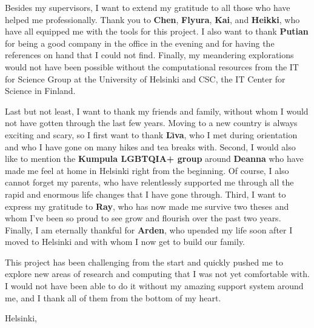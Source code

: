 \begin{acknowledgements}
    Besides my supervisors, I want to extend my gratitude to all those who have helped me professionally. Thank you to \textbf{Chen}, \textbf{Flyura}, \textbf{Kai}, and \textbf{Heikki}, who have all equipped me with the tools for this project. I also want to thank \textbf{Putian} for being a good company in the office in the evening and for having the references on hand that I could not find. Finally, my meandering explorations would not have been possible without the computational resources from the IT for Science Group at the University of Helsinki and CSC, the IT Center for Science in Finland.

    Last but not least, I want to thank my friends and family, without whom I would not have gotten through the last few years. Moving to a new country is always exciting and scary, so I first want to thank \textbf{L\={\i}va}, who I met during orientation and who I have gone on many hikes and tea breaks with. Second, I would also like to mention the \textbf{Kumpula LGBTQIA+ group} around \textbf{Deanna} who have made me feel at home in Helsinki right from the beginning. Of course, I also cannot forget my parents, who have relentlessly supported me through all the rapid and enormous life changes that I have gone through. Third, I want to express my gratitude to \textbf{Ray}, who has now made me survive two theses and whom I've been so proud to see grow and flourish over the past two years. Finally, I am eternally thankful for \textcolor{arden}{\textbf{Arden}}, who upended my life soon after I moved to Helsinki and with whom I now get to build our family.

    \newpar This project has been challenging from the start and quickly pushed me to explore new areas of research and computing that I was not yet comfortable with. I would not have been able to do it without my amazing support system around me, and I thank all of them from the bottom of my heart.
 
    \newpar \begin{flushright}
        Helsinki, \MyyyyDate\@date

        \@author
    \end{flushright}
\end{acknowledgements}
